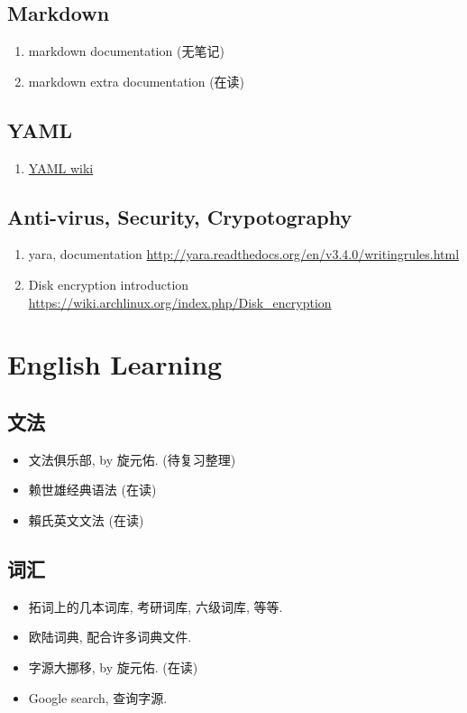 \documentclass{article}
\begin{document}
\subsection{Markdown}
\begin{enumerate}
    \item markdown documentation (无笔记)
    \item markdown extra documentation (在读)
\end{enumerate}
\subsection{YAML}
\begin{enumerate}
    \item \href{https://en.wikipedia.org/wiki/YAML}{YAML wiki}
\end{enumerate}
\subsection{Anti-virus, Security, Crypotography}
\begin{enumerate}
    \item yara, documentation \url{http://yara.readthedocs.org/en/v3.4.0/writingrules.html}
    \item Disk encryption introduction \url{https://wiki.archlinux.org/index.php/Disk_encryption}
\end{enumerate}
\section{English Learning}
\subsection{文法}
\begin{itemize}
    \item 文法俱乐部, by 旋元佑. (待复习整理)
    \item 赖世雄经典语法 (在读)
    \item 賴氏英文文法 (在读)
\end{itemize}
\subsection{词汇}
\begin{itemize}
    \item 拓词上的几本词库, 考研词库, 六级词库, 等等.
    \item 欧陆词典, 配合许多词典文件.
    \item 字源大挪移, by 旋元佑. (在读)
    \item Google search, 查询字源.
\end{itemize}
\end{document}
